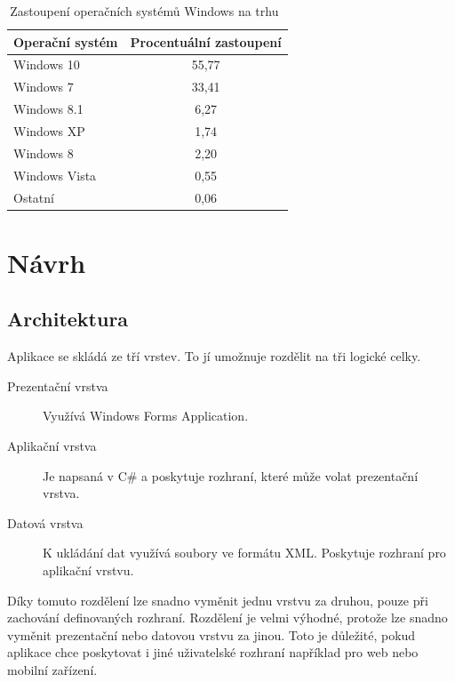 \documentclass[thesis=B,czech]{FITthesis}[2012/10/20]
\begin{document}
\begin{table}[]
\begin{tabular}{lc}
Operační systém & Procentuální zastoupení \\
\hline
Windows 10      & 55,77                   \\
Windows 7       & 33,41                   \\
Windows 8.1     & 6,27                    \\
Windows XP      & 1,74                    \\
Windows 8       & 2,20                    \\
Windows Vista   & 0,55                    \\
Ostatní         & 0,06                   
\end{tabular}
\caption{Zastoupení operačních systémů Windows na trhu~\cite{windowsPer}}
\label{table:1}
\end{table}

\chapter{Návrh}

\section{Architektura}

Aplikace se skládá ze tří vrstev. To jí umožnuje rozdělit na tři logické celky.

\begin{description}
	\item[Prezentační vrstva] Využívá Windows Forms Application.
	\item[Aplikační vrstva] Je napsaná v C\# a poskytuje rozhraní, které může volat prezentační vrstva.
	\item[Datová vrstva] K ukládání dat využívá soubory ve formátu XML. Poskytuje rozhraní pro aplikační vrstvu. 
\end{description}

Díky tomuto rozdělení lze snadno vyměnit jednu vrstvu za druhou, pouze při zachování definovaných rozhraní. Rozdělení je velmi výhodné, protože lze snadno vyměnit prezentační nebo datovou vrstvu za jinou. Toto je důležité, pokud aplikace chce poskytovat i jiné uživatelské rozhraní například pro web nebo mobilní zařízení.
\end{document}

